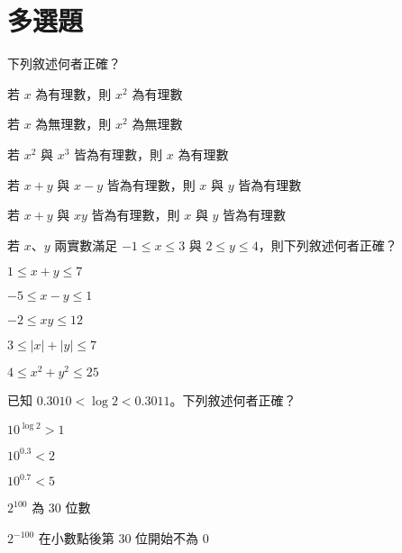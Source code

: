 \documentclass[12pt]{article}
\newenvironment{choices}[1]{\par\NumTabs{#1}\begin{enumerate*}[label=(\Alph*),itemjoin=\tab]}{\end{enumerate*}}
\begin{document}
\section{多選題}
\begin{enumerate}[align=left,leftmargin=*,labelsep=.6em,resume]
  \item 下列敘述何者正確？
  \begin{choices}{1}
    \item 若 $x$ 為有理數，則 $x^2$ 為有理數
    \item 若 $x$ 為無理數，則 $x^2$ 為無理數
    \item 若 $x^2$ 與 $x^3$ 皆為有理數，則 $x$ 為有理數
    \item 若 $x+y$ 與 $x-y$ 皆為有理數，則 $x$ 與 $y$ 皆為有理數
    \item 若 $x+y$ 與 $xy$ 皆為有理數，則 $x$ 與 $y$ 皆為有理數
  \end{choices}
  \item 若 $x$、$y$ 兩實數滿足 $-1 \leq x \leq 3$ 與 $2 \leq y \leq 4$，則下列敘述何者正確？
  \begin{choices}{1}
    \item $1 \leq x + y \leq 7$
    \item $-5 \leq x - y \leq 1$
    \item $-2 \leq xy \leq 12$
    \item $3 \leq \lvert x \rvert + \lvert y \rvert \leq 7$
    \item $4 \leq x^2 + y^2 \leq 25$
  \end{choices}
  \item 已知 $0.3010 < \log 2 < 0.3011$。下列敘述何者正確？
  \begin{choices}{1}
    \item $10^{\log 2} > 1$
    \item $10^{0.3} < 2$
    \item $10^{0.7} < 5$
    \item $2^{100}$ 為 30 位數
    \item $2^{-100}$ 在小數點後第 30 位開始不為 0
  \end{choices}
\end{enumerate}

\end{document}
